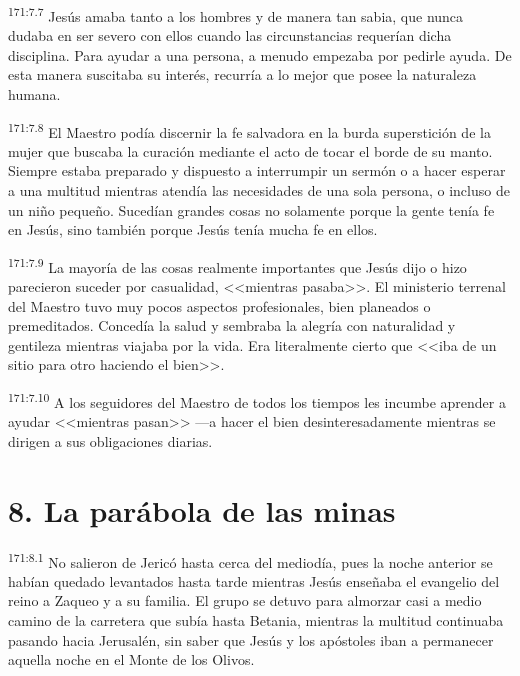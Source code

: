 \par 
\textsuperscript{171:7.7} Jesús amaba tanto a los hombres y de manera tan sabia, que nunca dudaba en ser severo con ellos cuando las circunstancias requerían dicha disciplina. Para ayudar a una persona, a menudo empezaba por pedirle ayuda. De esta manera suscitaba su interés, recurría a lo mejor que posee la naturaleza humana.

\par 
\textsuperscript{171:7.8} El Maestro podía discernir la fe salvadora en la burda superstición de la mujer que buscaba la curación mediante el acto de tocar el borde de su manto. Siempre estaba preparado y dispuesto a interrumpir un sermón o a hacer esperar a una multitud mientras atendía las necesidades de una sola persona, o incluso de un niño pequeño. Sucedían grandes cosas no solamente porque la gente tenía fe en Jesús, sino también porque Jesús tenía mucha fe en ellos.

\par 
\textsuperscript{171:7.9} La mayoría de las cosas realmente importantes que Jesús dijo o hizo parecieron suceder por casualidad, <<mientras pasaba>>. El ministerio terrenal del Maestro tuvo muy pocos aspectos profesionales, bien planeados o premeditados. Concedía la salud y sembraba la alegría con naturalidad y gentileza mientras viajaba por la vida. Era literalmente cierto que <<iba de un sitio para otro haciendo el bien>>.

\par 
\textsuperscript{171:7.10} A los seguidores del Maestro de todos los tiempos les incumbe aprender a ayudar <<mientras pasan>> ---a hacer el bien desinteresadamente mientras se dirigen a sus obligaciones diarias.

\section*{8. La parábola de las minas}
\par 
\textsuperscript{171:8.1} No salieron de Jericó hasta cerca del mediodía, pues la noche anterior se habían quedado levantados hasta tarde mientras Jesús enseñaba el evangelio del reino a Zaqueo y a su familia. El grupo se detuvo para almorzar casi a medio camino de la carretera que subía hasta Betania, mientras la multitud continuaba pasando hacia Jerusalén, sin saber que Jesús y los apóstoles iban a permanecer aquella noche en el Monte de los Olivos.

